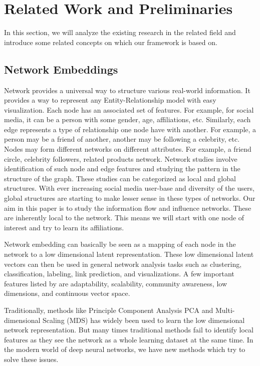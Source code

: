 \section{Related Work and Preliminaries}
In this section, we will analyze the existing research in the related field and introduce some related concepts on which our framework is based on.

\subsection{Network Embeddings}
Network provides a universal way to structure various real-world information. It provides a way to represent any Entity-Relationship model with easy visualization. Each node has an associated set of features. For example, for social media, it can be a person with some gender, age, affiliations, etc. Similarly, each edge represents a type of relationship one node have with another. For example, a person may be a friend of another, another may be following a celebrity, etc. Nodes may form different networks on different attributes. For example, a friend circle, celebrity followers, related products network. Network studies involve identification of such node and edge features and studying the pattern in the structure of the graph. These studies can be categorized as local and global structures. With ever increasing social media user-base and diversity of the users, global structures are starting to make lesser sense in these types of networks. Our aim in this paper is to study the information flow and influence networks. These are inherently local to the network. This means we will start with one node of interest and try to learn its affiliations.

Network embedding can basically be seen as a mapping of each node in the network to a low dimensional latent representation. These low dimensional latent vectors can then be used in general network analysis tasks such as clustering, classification, labeling, link prediction, and visualizations. A few important features listed by \cite{chen2018tutorial} are adaptability, scalability, community awareness, low dimensions, and continuous vector space.

Traditionally, methods like Principle Component Analysis PCA \cite{krackhardt1988predicting} and Multi-dimensional Scaling (MDS) \cite{breiger1975algorithm} has widely been used to learn the low dimensional network representation. But many times traditional methods fail to identify local features as they see the network as a whole learning dataset at the same time. In the modern world of deep neural networks, we have new methods which try to solve these issues.

